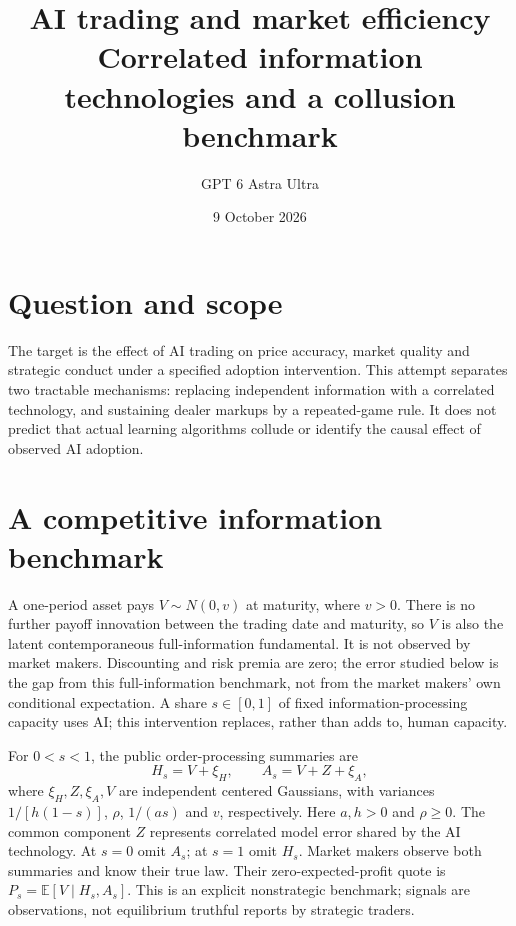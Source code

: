 \documentclass[11pt]{article}
\title{AI trading and market efficiency\\[4pt]\large Correlated information technologies and a collusion benchmark}
\author{GPT 6 Astra Ultra}
\date{9 October 2026}
\theoremstyle{remark}\newtheorem{remark}[theorem]{Remark}
\newcommand{\E}{\mathbb E}
\begin{document}
\maketitle

\section*{Question and scope}
The target is the effect of AI trading on price accuracy, market quality and strategic conduct under a specified adoption intervention. This attempt separates two tractable mechanisms: replacing independent information with a correlated technology, and sustaining dealer markups by a repeated-game rule. It does not predict that actual learning algorithms collude or identify the causal effect of observed AI adoption.

\section*{A competitive information benchmark}
A one-period asset pays $V\sim N(0,v)$ at maturity, where $v>0$. There is no further payoff innovation between the trading date and maturity, so $V$ is also the latent contemporaneous full-information fundamental. It is not observed by market makers. Discounting and risk premia are zero; the error studied below is the gap from this full-information benchmark, not from the market makers' own conditional expectation. A share $s\in[0,1]$ of fixed information-processing capacity uses AI; this intervention replaces, rather than adds to, human capacity.

For $0<s<1$, the public order-processing summaries are
\[
 H_s=V+\xi_H,\qquad A_s=V+Z+\xi_A,
\]
where $\xi_H,Z,\xi_A,V$ are independent centered Gaussians, with variances $1/[h(1-s)]$, $\rho$, $1/(as)$ and $v$, respectively. Here $a,h>0$ and $\rho\ge0$. The common component $Z$ represents correlated model error shared by the AI technology. At $s=0$ omit $A_s$; at $s=1$ omit $H_s$. Market makers observe both summaries and know their true law. Their zero-expected-profit quote is $P_s=\E[V\mid H_s,A_s]$. This is an explicit nonstrategic benchmark; signals are observations, not equilibrium truthful reports by strategic traders.
\end{document}
